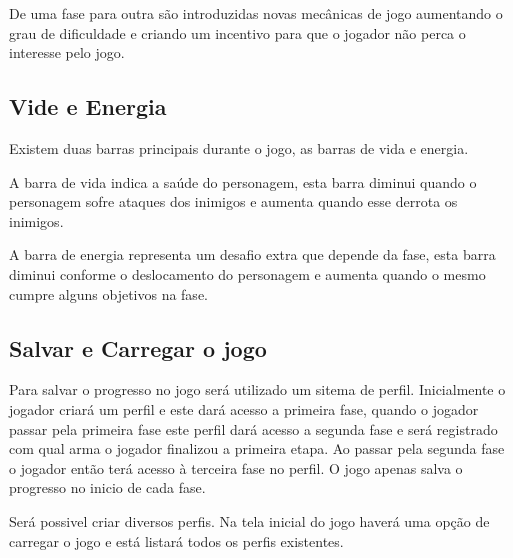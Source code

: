De uma fase para outra são introduzidas novas mecânicas de jogo aumentando o
 grau de dificuldade e criando um incentivo para que o jogador 
não perca o interesse pelo jogo.

\subsection {Vide e Energia}

Existem duas barras principais durante o jogo, as barras de vida e energia. 

A barra de vida indica a saúde do personagem, esta barra diminui quando
o personagem sofre ataques dos inimigos e aumenta quando esse derrota os
 inimigos.

A barra de energia representa um desafio extra que depende da fase, esta
 barra diminui conforme o deslocamento do personagem e aumenta quando o 
mesmo cumpre alguns objetivos na fase.

\subsection {Salvar e Carregar o jogo}
Para salvar o progresso no jogo será utilizado um sitema de perfil. Inicialmente o jogador criará um perfil e este dará acesso 
a primeira fase, quando o jogador passar pela primeira fase este perfil dará acesso a segunda fase e será registrado com qual arma o jogador
finalizou a primeira etapa. Ao passar pela segunda fase o jogador então terá acesso à terceira fase no perfil. O jogo apenas salva o progresso 
no inicio de cada fase.

Será possivel criar diversos perfis. Na tela inicial do jogo haverá uma opção de carregar o jogo e está listará todos os perfis existentes.